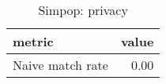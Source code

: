 \begin{table}[ht]
\centering
\begin{tabular}{lr}
  \hline
metric & value \\ 
  \hline
Naive match rate & 0.00 \\ 
   \hline
\end{tabular}
\caption{Simpop: privacy} 
\end{table}

